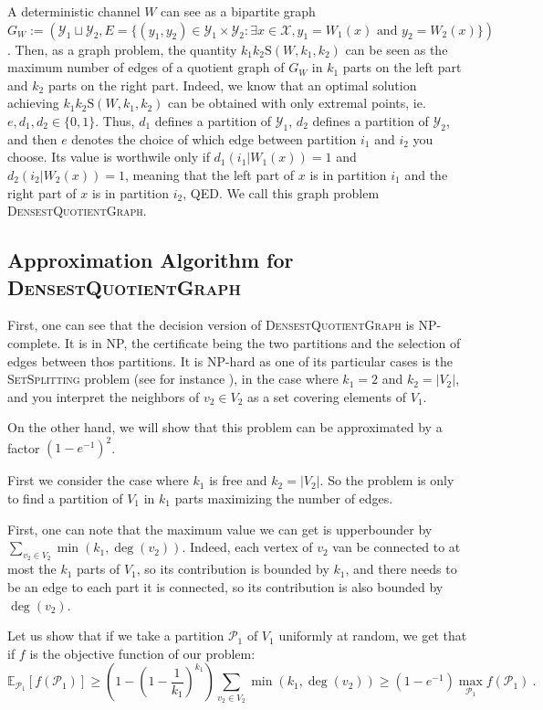 \documentclass[11pt]{article}
\theoremstyle{definition}
\theoremstyle{remark}
\begin{document}
A deterministic channel $W$ can see as a bipartite graph $G_W:=(\mathcal{Y}_1 \sqcup \mathcal{Y}_2, E = \{(y_1,y_2) \in \mathcal{Y}_1 \times \mathcal{Y}_2: \exists x \in \mathcal{X}, y_1=W_1(x) \text{ and } y_2=W_2(x)\})$.
Then, as a graph problem, the quantity $k_1k_2\mathrm{S}(W,k_1,k_2)$ can be seen as the maximum number of edges of a quotient graph of $G_W$ in $k_1$ parts on the left part and $k_2$ parts on the right part. Indeed, we know that an optimal solution achieving $k_1k_2\mathrm{S}(W,k_1,k_2)$ can be obtained with only extremal points, ie. $e,d_1,d_2 \in \{0,1\}$. Thus, $d_1$ defines a partition of $\mathcal{Y}_1$, $d_2$ defines a partition of $\mathcal{Y}_2$, and then $e$ denotes the choice of which edge between partition $i_1$ and $i_2$ you choose. Its value is worthwile only if $d_1(i_1|W_1(x))=1$ and $d_2(i_2|W_2(x))=1$, meaning that the left part of $x$ is in partition $i_1$ and the right part of $x$ is in partition $i_2$, QED. We call this graph problem \textsc{DensestQuotientGraph}.

\subsection{Approximation Algorithm for \textsc{DensestQuotientGraph}}
First, one can see that the decision version of \textsc{DensestQuotientGraph} is \textrm{NP}-complete. It is in \textrm{NP}, the certificate being the two partitions and the selection of edges between thos partitions. It is \textrm{NP}-hard as one of its particular cases is the \textsc{SetSplitting} problem (see for instance \cite{GJ79}), in the case where $k_1=2$ and $k_2=|V_2|$, and you interpret the neighbors of $v_2 \in V_2$ as a set covering elements of $V_1$.

On the other hand, we will show that this problem can be approximated by a factor $(1-e^{-1})^2$.

First we consider the case where $k_1$ is free and $k_2=|V_2|$. So the problem is only to find a partition of $V_1$ in $k_1$ parts maximizing the number of edges.

First, one can note that the maximum value we can get is upperbounder by $\sum_{v_2 \in V_2}\min\left(k_1,\deg(v_2)\right)$. Indeed, each vertex of $v_2$ van be connected to at most the $k_1$ parts of $V_1$, so its contribution is bounded by $k_1$, and there needs to be an edge to each part it is connected, so its contribution is also bounded by $\deg(v_2)$.

Let us show that if we take a partition $\mathcal{P}_1$ of $V_1$ uniformly at random, we get that if $f$ is the objective function of our problem:
\[ \mathbb{E}_{\mathcal{P}_1}[f(\mathcal{P}_1)] \geq \left(1-\left(1-\frac{1}{k_1}\right)^{k_1}\right)\sum_{v_2 \in V_2}\min\left(k_1,\deg(v_2)\right) \geq (1-e^{-1})\max_{\mathcal{P}_1}f(\mathcal{P}_1) \ .\]
\end{document}

